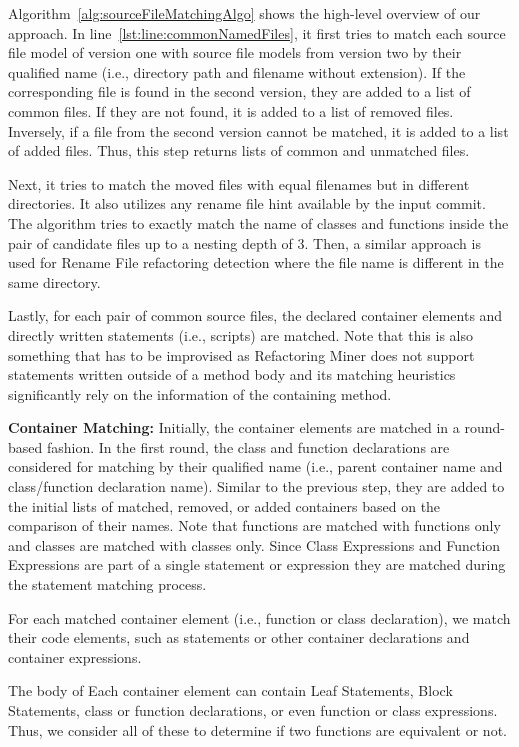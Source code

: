 \documentclass[letterpaper,12pt,onecolumn,final]{report}
\begin{document}
Algorithm~\ref{alg:sourceFileMatchingAlgo} shows the high-level overview of our approach. In line~\ref{lst:line:commonNamedFiles}, it first tries to match each source file model of version one with source file models from version two by their qualified name (i.e., directory path and filename without extension). If the corresponding file is found in the second version, they are added to a list of common files. If they are not found, it is added to a list of removed files. Inversely, if a file from the second version cannot be matched, it is added to a list of added files. Thus, this step returns lists of common and unmatched files.

Next, it tries to match the moved files with equal filenames but in different directories. It also utilizes any rename file hint available by the input commit. The algorithm tries to exactly match the name of classes and functions inside the pair of candidate files up to a nesting depth of 3. Then, a similar approach is used for Rename File refactoring detection where the file name is different in the same directory.

Lastly, for each pair of common source files, the declared container elements and directly written statements (i.e., scripts) are matched. Note that this is also something that has to be improvised as Refactoring Miner does not support statements written outside of a method body and its matching heuristics significantly rely on the information of the containing method.

\textbf{Container Matching:} Initially, the container elements are matched in a round-based fashion. In the first round, the class and function declarations are considered for matching by their qualified name (i.e., parent container name and class/function declaration name). Similar to the previous step, they are added to the initial lists of matched, removed, or added containers based on the comparison of their names. Note that functions are matched with functions only and classes are matched with classes only. Since Class Expressions and Function Expressions are part of a single statement or expression they are matched during the statement matching process.

For each matched container element (i.e., function or class declaration), we match their code elements, such as statements or other container declarations and container expressions.

The body of Each container element can contain Leaf Statements, Block Statements, class or function declarations, or even function or class expressions. Thus, we consider all of these to determine if two functions are equivalent or not.
\end{document}
